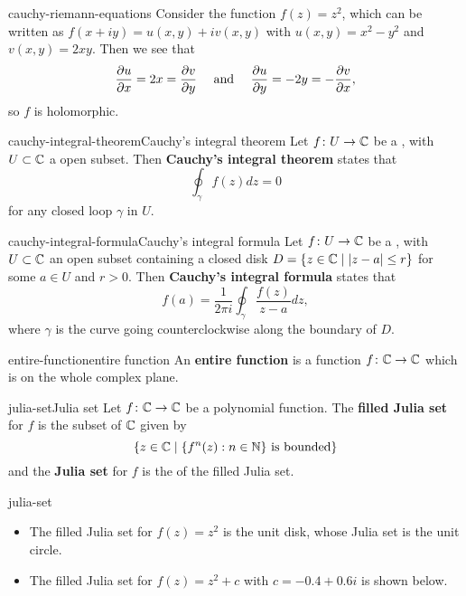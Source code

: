 \begin{example}{cauchy-riemann-equations}
    Consider the function $f(z) = z^2$, which can be written as $f(x + iy) = u(x, y) + iv(x, y)$ with $u(x, y) = x^2 - y^2$ and $v(x, y) = 2xy$. Then we see that
    \[ \frac{\partial u}{\partial x} = 2x = \frac{\partial v}{\partial y} \quad \textup{ and } \quad \frac{\partial u}{\partial y} = -2y = -\frac{\partial v}{\partial x} , \]
    so $f$ is holomorphic.
\end{example}

\begin{topic}{cauchy-integral-theorem}{Cauchy's integral theorem}
    Let $f \colon U \to \mathbb{C}$ be a , with $U \subset \mathbb{C}$ a  open subset. Then \textbf{Cauchy's integral theorem} states that
    \[ \oint_\gamma f(z) dz = 0 \]
    for any closed loop $\gamma$ in $U$.
\end{topic}

\begin{topic}{cauchy-integral-formula}{Cauchy's integral formula}
    Let $f \colon U \to \mathbb{C}$ be a , with $U \subset \mathbb{C}$ an open subset containing a closed disk $D = \{ z \in \mathbb{C} \mid |z - a| \le r \}$ for some $a \in U$ and $r > 0$. Then \textbf{Cauchy's integral formula} states that
    \[ f(a) = \frac{1}{2 \pi i} \oint_\gamma \frac{f(z)}{z - a} dz , \]
    where $\gamma$ is the curve going counterclockwise along the boundary of $D$.
\end{topic}

\begin{topic}{entire-function}{entire function}
    An \textbf{entire function} is a function $f \colon \mathbb{C} \to \mathbb{C}$ which is  on the whole complex plane.
\end{topic}

\begin{topic}{julia-set}{Julia set}
    Let $f \colon \mathbb{C} \to \mathbb{C}$ be a polynomial function. The \textbf{filled Julia set} for $f$ is the subset of $\mathbb{C}$ given by
    \[  \{ z \in \mathbb{C} \mid \{ f^n(z) : n \in \mathbb{N} \} \textup{ is bounded} \} \]
    and the \textbf{Julia set} for $f$ is the  of the filled Julia set.
\end{topic}

\begin{example}{julia-set}
    \begin{itemize}
        \item The filled Julia set for $f(z) = z^2$ is the unit disk, whose Julia set is the unit circle.
    
        \item The filled Julia set for $f(z) = z^2 + c$ with $c = -0.4 + 0.6i$ is shown below.
    \end{itemize}
\end{example}


